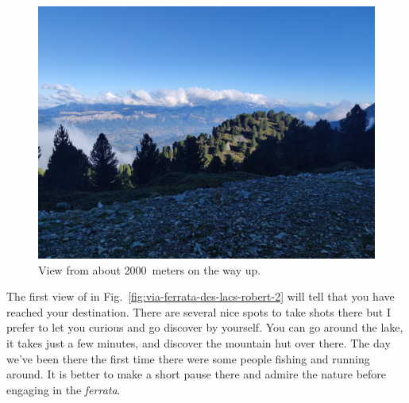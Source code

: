\begin{figure}[!h]
\centering%
\includegraphics[width=\columnwidth, clip]{media/pictures/via-ferrata-des-lacs-robert-1}
\caption{\label{fig:via-ferrata-des-lacs-robert-1}View from about 2000~meters on the way up.}
\end{figure}

The first view of  in Fig.~\ref{fig:via-ferrata-des-lacs-robert-2} will tell that you have reached your destination. There are several nice spots to take shots there but I prefer to let you curious and go discover by yourself. You can go around the lake, it takes just a few minutes, and discover the mountain hut over there. The day we've been there the first time there were some people fishing and running around. It is better to make a short pause there and admire the nature before engaging in the \emph{ferrata}.
 
